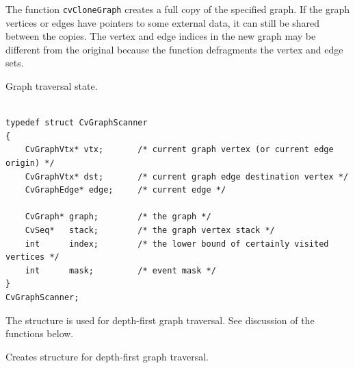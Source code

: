 \begin{description}
\end{description}


The function \texttt{cvCloneGraph} creates a full copy of the specified graph. If the
graph vertices or edges have pointers to some external data, it can still be
shared between the copies. The vertex and edge indices in the new graph
may be different from the original because the function defragments
the vertex and edge sets.


\label{CvGraphScanner}

Graph traversal state.

\begin{lstlisting}

typedef struct CvGraphScanner
{
    CvGraphVtx* vtx;       /* current graph vertex (or current edge origin) */
    CvGraphVtx* dst;       /* current graph edge destination vertex */
    CvGraphEdge* edge;     /* current edge */

    CvGraph* graph;        /* the graph */
    CvSeq*   stack;        /* the graph vertex stack */
    int      index;        /* the lower bound of certainly visited vertices */
    int      mask;         /* event mask */
}
CvGraphScanner;

\end{lstlisting}

The structure  is used for depth-first graph traversal. See discussion of the functions below.


\label{CreateGraphScanner}

Creates structure for depth-first graph traversal.


